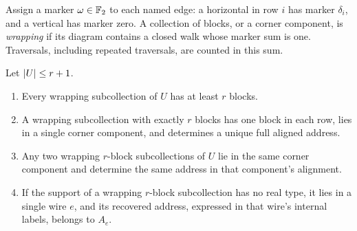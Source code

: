 Assign a marker \(\omega\in\mathbb F_2\) to each named edge: a horizontal in row
\(i\) has marker \(\delta_i\), and a vertical has marker zero.
A collection of blocks, or a corner component, is \emph{wrapping} if its
diagram contains a closed walk whose marker sum is one. Traversals,
including repeated traversals, are counted in this sum.

\begin{lemma}
\label{offset:lem-wrapping}
Let \(\lvert U\rvert\le r+1\).
\begin{enumerate}
 \item Every wrapping subcollection of \(U\) has at least \(r\) blocks.
 \item A wrapping subcollection with exactly \(r\) blocks has one block
 in each row, lies in a single corner component, and determines a unique
 full aligned address.
 \item Any two wrapping \(r\)-block subcollections of \(U\) lie in the
 same corner component and determine the same address in that
 component's alignment.
 \item If the support of a wrapping \(r\)-block subcollection has no real
 type, it lies in a single wire \(e\), and its recovered address,
 expressed in that wire's internal labels, belongs to \(A_e\).
\end{enumerate}
\end{lemma}

